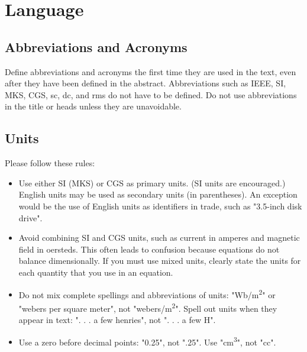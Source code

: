 \documentclass[a4paper,conference]{IEEEtran}
\begin{document}
\section{Language}
\label{sec3}

\subsection{Abbreviations and Acronyms}
\label{subsec2}
Define abbreviations and acronyms the first time they are used in the text, even after they have been defined in the abstract. Abbreviations such as IEEE, SI, MKS, CGS, sc, dc, and rms do not have to be defined. Do not use abbreviations in the title or heads unless they are unavoidable.

\subsection{Units}
\label{subsec2}
Please follow these rules: %
\begin{itemize}
\item Use either SI (MKS) or CGS as primary units. (SI units are encouraged.) English units may be used as secondary units (in parentheses). An exception would be the use of English units as identifiers in trade, such as "3.5-inch disk drive".
\item Avoid combining SI and CGS units, such as current in amperes and magnetic field in oersteds. This often leads to confusion because equations do not balance dimensionally. If you must use mixed units, clearly state the units for each quantity that you use in an equation.
\item Do not mix complete spellings and abbreviations of units: "Wb/m\textsuperscript{2}" or "webers per square meter", not "webers/m\textsuperscript{2}". Spell out units when they appear in text: ". . . a few henries", not ". . . a few H".
\item Use a zero before decimal points: "0.25", not ".25". Use "cm\textsuperscript{3}", not "cc".
\end{itemize}
\end{document}
